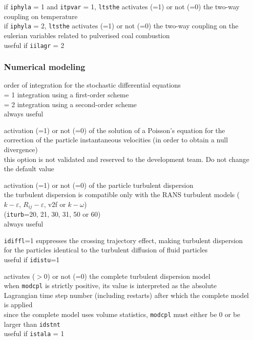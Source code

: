 {if \texttt{iphyla} = 1 and \texttt{itpvar} = 1, \texttt{ltsthe}
 activates (=1) or not (=0) the two-way coupling on temperature\\
if \texttt{iphyla} = 2, \texttt{ltsthe} activates (=1) or not (=0) the
two-way coupling on the eulerian variables related to pulverised coal
combustion\\
useful if \texttt{iilagr} = 2}

\subsubsection{Numerical modeling}

{order of integration for the stochastic differential equations\\
\hspace*{1.3cm} = 1 integration using a first-order scheme\\
\hspace*{1.3cm} = 2 integration using a second-order scheme\\
always useful}

{activation (=1) or not (=0) of the solution of a Poisson's equation for
the correction of the particle instantaneous velocities (in order to obtain a
null divergence)\\
this option is not validated and reserved to the development team. Do not change
the default value}

{activation (=1) or not (=0) of the particle turbulent dispersion\\
the turbulent dispersion is compatible only with the RANS turbulent models
($k-\varepsilon$, $R_{ij}-\varepsilon$, v2f or $k-\omega$)\\
(\texttt{iturb}=20, 21, 30, 31, 50 or 60)\\
always useful}

{\texttt{idiffl}=1 suppresses the crossing trajectory effect, making
turbulent dispersion for the particles identical to the turbulent
diffusion of fluid particles\\
useful if \texttt{idistu}=1}

{activates ($>$0) or not (=0) the complete turbulent dispersion model\\
when \texttt{modcpl} is strictly positive, its value is interpreted as the
absolute Lagrangian time step number (including restarts) after which the
complete model is applied\\
since the complete model uses volume statistics, \texttt{modcpl} must
either be 0 or be larger than \texttt{idstnt}\\
useful if \texttt{istala} = 1}


